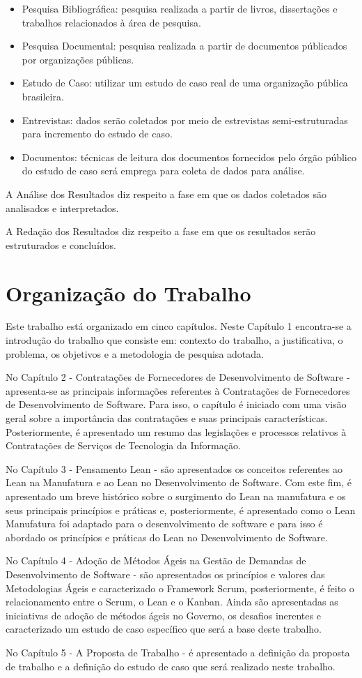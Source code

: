 \begin{itemize}
\item Pesquisa Bibliográfica: pesquisa realizada a partir de livros, dissertações e trabalhos relacionados à área de pesquisa.
\item Pesquisa Documental: pesquisa realizada a partir de documentos públicados por organizações públicas.
\item Estudo de Caso: utilizar um estudo de caso real de uma organização pública brasileira.
\item Entrevistas: dados serão coletados por meio de estrevistas semi-estruturadas para incremento do estudo de caso.
\item Documentos: técnicas de leitura dos documentos fornecidos pelo órgão público do estudo de caso será emprega para coleta de dados para análise.
\end{itemize}

A Análise dos Resultados diz respeito a fase em que os dados coletados são analisados e interpretados.

A Redação dos Resultados diz respeito a fase em que os resultados serão estruturados e concluídos.

\section[Organização do Trabalho]{Organização do Trabalho}

Este trabalho está organizado em cinco capítulos. Neste Capítulo 1 encontra-se a introdução do trabalho que consiste em: contexto do trabalho, a justificativa,  o problema, os objetivos e a metodologia de pesquisa adotada.

No Capítulo 2 - Contratações de Fornecedores de Desenvolvimento de Software - apresenta-se as principais informações referentes à Contratações de Fornecedores de Desenvolvimento de Software. Para isso, o capítulo é iniciado com uma visão geral sobre a importância das contratações e suas principais características. Posteriormente, é apresentado um resumo das legislações e processos relativos à Contratações de Serviços de Tecnologia da Informação.

No Capítulo 3 - Pensamento Lean - são apresentados os conceitos referentes ao Lean na Manufatura e ao Lean no Desenvolvimento de Software. Com este fim, é apresentado um breve histórico sobre o surgimento do Lean na manufatura e os seus principais princípios e práticas e, posteriormente, é apresentado como o Lean Manufatura foi adaptado para o desenvolvimento de software e para isso é abordado os princípios e práticas do Lean no Desenvolvimento de Software.

No Capítulo 4  - Adoção de Métodos Ágeis na Gestão de Demandas de Desenvolvimento de Software - são apresentados os princípios e valores das Metodologias Ágeis e caracterizado o Framework Scrum, posteriormente, é feito o relacionamento entre o Scrum, o Lean e o Kanban. Ainda são apresentadas as iniciativas de adoção de métodos ágeis no Governo, os desafios inerentes e caracterizado um estudo de caso específico que será a base deste trabalho.

No Capítulo 5 - A Proposta de Trabalho - é apresentado a definição da proposta de trabalho e a definição do estudo de caso que será realizado neste trabalho.